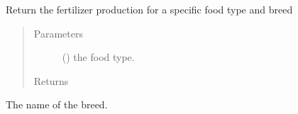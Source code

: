 \documentclass[letterpaper,10pt,english]{sphinxmanual}
\begin{document}
\begin{fulllineitems}
\begin{fulllineitems}
\label{\detokenize{farming:farming.part3_fertilizer.Breed.get_fertilizer_production}}
\sphinxAtStartPar
Return the fertilizer production for a specific food type and breed
\begin{quote}\begin{description}
\item[{Parameters}] \leavevmode
\sphinxAtStartPar
{} ({\hyperref[\detokenize{farming:farming.part3_fertilizer.FoodType}]{}}) \textendash{} the food type.

\item[{Returns}] \leavevmode
\sphinxAtStartPar
{}

\end{description}\end{quote}

\end{fulllineitems}


\begin{fulllineitems}
\label{\detokenize{farming:farming.part3_fertilizer.Breed.name}}
\sphinxAtStartPar
The name of the breed.

\end{fulllineitems}


\end{fulllineitems}

\end{document}
